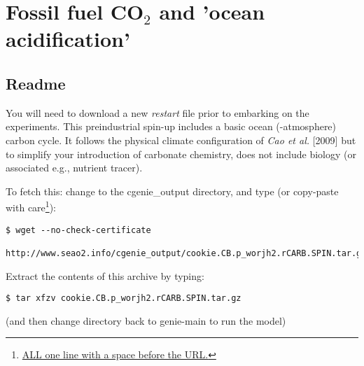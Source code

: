 
\cleardoublepage


\chapter{Fossil fuel CO$_{2}$ and 'ocean acidification'}\label{ch:fossil-fuel-co2}

\hfill \break

\newpage

\section*{Readme}

You will need to download a new \textit{restart} file prior to embarking on the experiments. This preindustrial spin-up includes a basic ocean (-atmosphere) carbon cycle. It follows the physical climate configuration of \textit{Cao et al.} [2009] but to simplify your introduction of carbonate chemistry, does not include biology (or associated e.g., nutrient tracer).

\vspace{2mm}

\noindent To fetch this: change to the \textsf{\footnotesize cgenie\_output} directory, and type (or copy-paste with care\footnote{\uline{ALL one line with a space before the URL.}}):
\vspace{-2mm}\small\begin{verbatim}
$ wget --no-check-certificate 
   http://www.seao2.info/cgenie_output/cookie.CB.p_worjh2.rCARB.SPIN.tar.gz
\end{verbatim}\normalsize\vspace{-2mm}

\noindent Extract the contents of this archive by typing:
\vspace{-2mm}\small\begin{verbatim}
$ tar xfzv cookie.CB.p_worjh2.rCARB.SPIN.tar.gz
\end{verbatim}\normalsize\vspace{-2mm}
\noindent (and then change directory back to \textsf{\footnotesize genie-main} to run the model)

